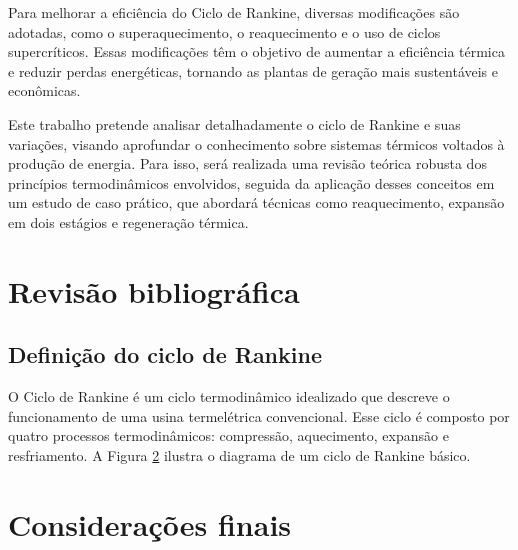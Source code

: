 \documentclass[
	article,			%
	11pt,				%
	oneside,			%
	a4paper,			%
	english,			%
	brazil,				%
	sumario=tradicional
	]{abntex2}
\begin{document}
Para melhorar a eficiência do Ciclo de Rankine, diversas modificações são adotadas, como o superaquecimento, o reaquecimento e o uso de ciclos supercríticos. Essas modificações têm o objetivo de aumentar a eficiência térmica e reduzir perdas energéticas, tornando as plantas de geração mais sustentáveis e econômicas.

Este trabalho pretende analisar detalhadamente o ciclo de Rankine e suas variações, visando aprofundar o conhecimento sobre sistemas térmicos voltados à produção de energia. Para isso, será realizada uma revisão teórica robusta dos princípios termodinâmicos envolvidos, seguida da aplicação desses conceitos em um estudo de caso prático, que abordará técnicas como reaquecimento, expansão em dois estágios e regeneração térmica.

\section{Revisão bibliográfica}

\subsection{Definição do ciclo de Rankine}

O Ciclo de Rankine é um ciclo termodinâmico idealizado que descreve o funcionamento de uma usina termelétrica convencional. Esse ciclo é composto por quatro processos termodinâmicos: compressão, aquecimento, expansão e resfriamento. A Figura \ref{} ilustra o diagrama de um ciclo de Rankine básico.


%

\section{Considerações finais}

\postextual


\end{document}
